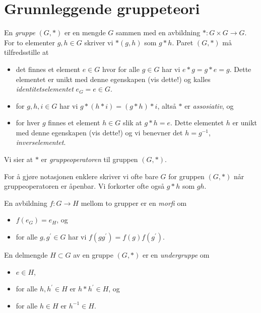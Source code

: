 \section{Grunnleggende gruppeteori}

\begin{definition}
    En \textit{gruppe} $(G,\ast)$ er en mengde $G$ sammen med en avbildning
    $\ast\colon G\times G\to G$.
    For to elementer $g, h\in G$ skriver vi $\ast(g,h)$ som $g\ast h$.
    Paret $(G, \ast)$ må tilfredsstille at
    \begin{itemize}
        \item det finnes et element $e\in G$ hvor for alle $g\in G$
            har vi $e\ast g = g\ast e = g$.
            Dette elementet er unikt med denne egenskapen (vis dette!)
            og kalles \textit{identitetselementet} $e_G = e \in G$.
        \item for $g, h, i\in G$ har vi
            $g\ast (h\ast i) = (g\ast h)\ast i$,
            altså $\ast$ er \textit{assosiativ}, og
        \item for hver $g$ finnes et element $h\in G$
            slik at $g \ast h = e$.
            Dette elementet $h$ er unikt med denne egenskapen (vis dette!)
            og vi benevner det $h = g^{-1}$, \textit{inverselementet}.
    \end{itemize}
    Vi sier at $\ast$ er \textit{gruppeoperatoren} til gruppen $(G,\ast)$.
\end{definition}

For å gjøre notasjonen enklere skriver vi ofte bare $G$ for gruppen $(G,\ast)$
når gruppeoperatoren er åpenbar.
Vi forkorter ofte også $g\ast h$ som $gh$.

\begin{definition}
    En avbildning $f\colon G\to H$ mellom to grupper
    er en \textit{morfi} om
    \begin{itemize}
        \item $f(e_G) = e_H$, og
        \item for alle $g, g^\prime\in G$ har vi $f(gg^\prime) = f(g)f(g^\prime)$.
    \end{itemize}
\end{definition}

\begin{definition}
    En delmengde $H\subset G$ av en gruppe $(G, \ast)$ er en \textit{undergruppe}
    om
    \begin{itemize}
        \item $e\in H$,
        \item for alle $h, h^\prime \in H$ er $h\ast h^\prime\in H$,
            og
        \item for alle $h\in H$ er $h^{-1}\in H$.
    \end{itemize}
\end{definition}

